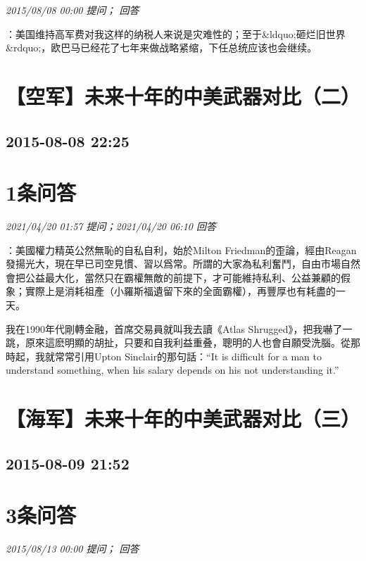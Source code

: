 \documentclass[twocolumn]{ctexart}
\begin{document}
\textit{\hfill\noindent\small 2015/08/08 00:00 提问； 回答}

：美国维持高军费对我这样的纳税人来说是灾难性的；至于\&ldquo;砸烂旧世界\&rdquo;，欧巴马已经花了七年来做战略紧缩，下任总统应该也会继续。\\


\section{【空军】未来十年的中美武器对比（二）}
\subsection{2015-08-08 22:25}


\section{1条问答}

\textit{\hfill\noindent\small 2021/04/20 01:57 提问；2021/04/20 06:10 回答}

：美國權力精英公然無恥的自私自利，始於Milton Friedman的歪論，經由Reagan發揚光大，現在早已司空見慣、習以爲常。所謂的大家為私利奮鬥，自由市場自然會把公益最大化，當然只在霸權無敵的前提下，才可能維持私利、公益兼顧的假象；實際上是消耗祖產（小羅斯福遺留下來的全面霸權），再豐厚也有耗盡的一天。

我在1990年代剛轉金融，首席交易員就叫我去讀《Atlas Shrugged》，把我嚇了一跳，原來這麽明顯的胡扯，只要和自我利益重叠，聰明的人也會自願受洗腦。從那時起，我就常常引用Upton Sinclair的那句話：“It is difficult for a man to understand something, when his salary depends on his not understanding it.”
\\


\section{【海军】未来十年的中美武器对比（三）}
\subsection{2015-08-09 21:52}


\section{3条问答}

\textit{\hfill\noindent\small 2015/08/13 00:00 提问； 回答}
\end{document}
